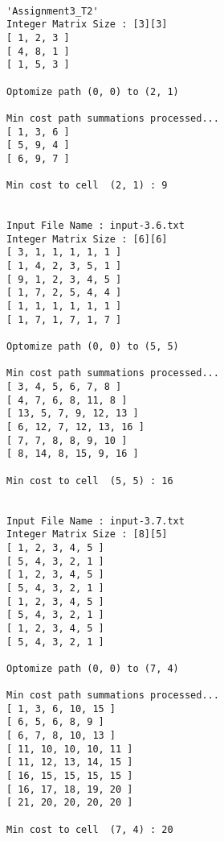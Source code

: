 \documentclass[11pt]{article}
\begin{document}
\pagebreak
\begin{verbatim}
    
'Assignment3_T2' 
Integer Matrix Size : [3][3]
[ 1, 2, 3 ]
[ 4, 8, 1 ]
[ 1, 5, 3 ]

Optomize path (0, 0) to (2, 1)

Min cost path summations processed...
[ 1, 3, 6 ]
[ 5, 9, 4 ]
[ 6, 9, 7 ]

Min cost to cell  (2, 1) : 9


Input File Name : input-3.6.txt
Integer Matrix Size : [6][6]
[ 3, 1, 1, 1, 1, 1 ]
[ 1, 4, 2, 3, 5, 1 ]
[ 9, 1, 2, 3, 4, 5 ]
[ 1, 7, 2, 5, 4, 4 ]
[ 1, 1, 1, 1, 1, 1 ]
[ 1, 7, 1, 7, 1, 7 ]

Optomize path (0, 0) to (5, 5)

Min cost path summations processed...
[ 3, 4, 5, 6, 7, 8 ]
[ 4, 7, 6, 8, 11, 8 ]
[ 13, 5, 7, 9, 12, 13 ]
[ 6, 12, 7, 12, 13, 16 ]
[ 7, 7, 8, 8, 9, 10 ]
[ 8, 14, 8, 15, 9, 16 ]

Min cost to cell  (5, 5) : 16


Input File Name : input-3.7.txt
Integer Matrix Size : [8][5]
[ 1, 2, 3, 4, 5 ]
[ 5, 4, 3, 2, 1 ]
[ 1, 2, 3, 4, 5 ]
[ 5, 4, 3, 2, 1 ]
[ 1, 2, 3, 4, 5 ]
[ 5, 4, 3, 2, 1 ]
[ 1, 2, 3, 4, 5 ]
[ 5, 4, 3, 2, 1 ]

Optomize path (0, 0) to (7, 4)

Min cost path summations processed...
[ 1, 3, 6, 10, 15 ]
[ 6, 5, 6, 8, 9 ]
[ 6, 7, 8, 10, 13 ]
[ 11, 10, 10, 10, 11 ]
[ 11, 12, 13, 14, 15 ]
[ 16, 15, 15, 15, 15 ]
[ 16, 17, 18, 19, 20 ]
[ 21, 20, 20, 20, 20 ]

Min cost to cell  (7, 4) : 20

\end{verbatim}
\end{document}
